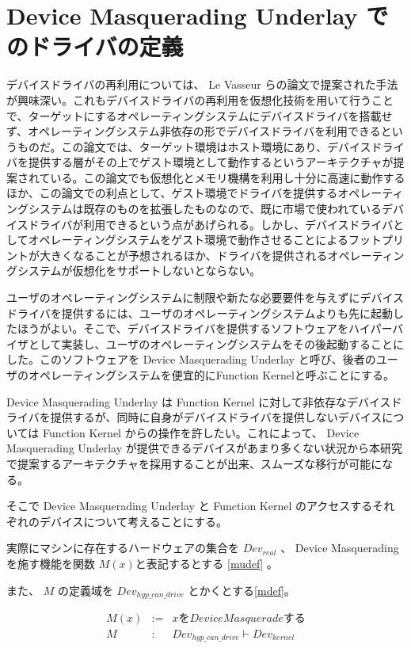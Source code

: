 \documentclass[a4paper,11pt,report]{ltjsbook}
\begin{document}
\section{Device Masquerading Underlay でのドライバの定義}

デバイスドライバの再利用については、 Le Vasseur らの論文\cite{reuse}で提案された手法が興味深い。これもデバイスドライバの再利用を仮想化技術を用いて行うことで、ターゲットにするオペレーティングシステムにデバイスドライバを搭載せず、オペレーティングシステム非依存の形でデバイスドライバを利用できるというものだ。この論文では、ターゲット環境はホスト環境にあり、デバイスドライバを提供する層がその上でゲスト環境として動作するというアーキテクチャが提案されている。この論文でも仮想化とメモリ機構を利用し十分に高速に動作するほか、この論文での利点として、ゲスト環境でドライバを提供するオペレーティングシステムは既存のものを拡張したものなので、既に市場で使われているデバイスドライバが利用できるという点があげられる。しかし、デバイスドライバとしてオペレーティングシステムをゲスト環境で動作させることによるフットプリントが大きくなることが予想されるほか、ドライバを提供されるオペレーティングシステムが仮想化をサポートしないとならない。

ユーザのオペレーティングシステムに制限や新たな必要要件を与えずにデバイスドライバを提供するには、ユーザのオペレーティングシステムよりも先に起動したほうがよい。そこで、デバイスドライバを提供するソフトウェアをハイパーバイザとして実装し、ユーザのオペレーティングシステムをその後起動することにした。このソフトウェアを Device Masquerading Underlay と呼び、後者のユーザのオペレーティングシステムを便宜的にFunction Kernelと呼ぶことにする。

Device Masquerading Underlay は Function Kernel に対して非依存なデバイスドライバを提供するが、同時に自身がデバイスドライバを提供しないデバイスについては Function Kernel からの操作を許したい。これによって、 Device Masquerading Underlay が提供できるデバイスがあまり多くない状況から本研究で提案するアーキテクチャを採用することが出来、スムーズな移行が可能になる。

そこで Device Masquerading Underlay と Function Kernel のアクセスするそれぞれのデバイスについて考えることにする。

実際にマシンに存在するハードウェアの集合を $ Dev_{real} $ 、 Device Masquerading を施す機能を関数 $ M(x) $と表記するとする \ref{mudef} 。

また、 $M$ の定義域を $ Dev_{hyp\_can\_drive} $ とかくとする\ref{mdef}。

\begin{eqnarray}
M(x) & := & x を Device Masquerade する\label{mudef}\\
M & : & Dev_{hyp\_can\_drive} \vdash Dev_{kernel}\label{mdef}
\end{eqnarray}
\end{document}
